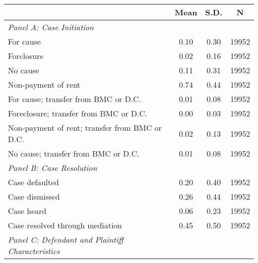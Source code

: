 \begin{table}[htbp]\centering
\def\sym#1{\ifmmode^{#1}\else\(^{#1}\)\fi}

\begin{tabular}{l*{1}{ccc}}
\toprule
                    &        Mean&        S.D.&           N\\
\midrule
\emph{Panel A: Case Initiation}&            &            &            \\
\hspace{0.25cm}For cause&        0.10&        0.30&       19952\\
\hspace{0.25cm}Forclosure&        0.02&        0.16&       19952\\
\hspace{0.25cm}No cause&        0.11&        0.31&       19952\\
\hspace{0.25cm}Non-payment of rent&        0.74&        0.44&       19952\\
\hspace{0.25cm}For cause; transfer from BMC or D.C.&        0.01&        0.08&       19952\\
\hspace{0.25cm}Foreclosure; transfer from BMC or D.C.&        0.00&        0.03&       19952\\
\hspace{0.25cm}Non-payment of rent; transfer from BMC or D.C.&        0.02&        0.13&       19952\\
\hspace{0.25cm}No cause; transfer from BMC or D.C.&        0.01&        0.08&       19952\\
\emph{Panel B: Case Resolution}&            &            &            \\
\hspace{0.25cm}Case defaulted&        0.20&        0.40&       19952\\
\hspace{0.25cm}Case dismissed&        0.26&        0.44&       19952\\
\hspace{0.25cm}Case heard&        0.06&        0.23&       19952\\
\hspace{0.25cm}Case resolved through mediation&        0.45&        0.50&       19952\\
\emph{Panel C: Defendant and Plaintiff Characteristics}&            &            &            \\

\end{tabular}
\end{table}
